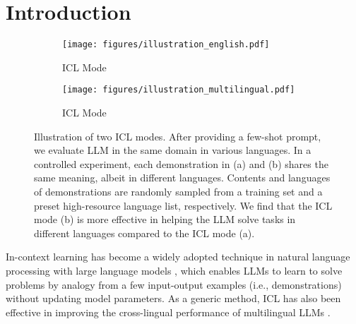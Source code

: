 \section{Introduction}

\begin{figure}[!t]
    \centering
    \begin{subfigure}[b]{\columnwidth} 
        \centering
        \texttt{[image: figures/illustration\_english.pdf]}
        \captionsetup{skip=3pt}
        \caption{\english ICL Mode}
        \label{fig:pull:english}
    \end{subfigure}

    \vspace{0.0cm} 
    \begin{subfigure}[b]{\columnwidth}
        \centering
        \texttt{[image: figures/illustration\_multilingual.pdf]}
        \captionsetup{skip=3pt}
        \caption{\multilingual ICL Mode}
        \label{fig:pull:multilingual}
    \end{subfigure}

    \caption{
        Illustration of two ICL modes. After providing a few-shot prompt, we evaluate LLM in the same domain in various languages. In a controlled experiment, each demonstration in (a) and (b) shares the same meaning, albeit in different languages. Contents and languages of demonstrations are randomly sampled from a training set and a preset high-resource language list, respectively. We find that the \multilingual ICL mode (b) is more effective in helping the LLM solve tasks in different languages compared to the \english ICL mode (a).
        \label{fig:pull}
    }
    \vspace{-5pt}
\end{figure}


\noindent In-context learning \citep[ICL;][]{lm_are_few_shot_learner} has become a widely adopted technique in natural language processing with large language models \cite[LLMs;][\textit{inter alia}]{llama2,palm,llama3,qwen2,qwen2.5}, which enables LLMs to learn to solve problems by analogy from a few input-output examples (i.e., demonstrations) without updating model parameters.
As a generic method, ICL has also been effective in improving the cross-lingual performance of multilingual LLMs \citep[MLLMs; ][]{lm_few_shot_multilingual_learner,mega,mgsm,few_shot_multilingual_nlu,buffet}.


